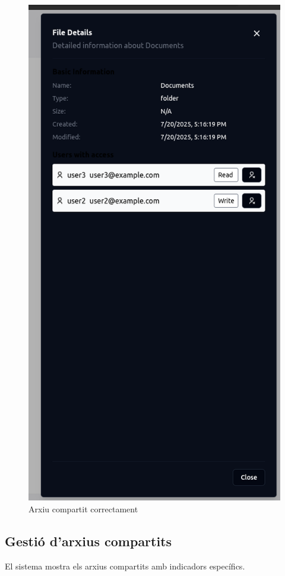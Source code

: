 \begin{figure}[H]
\centering
\includegraphics[width=0.8\linewidth]{Figures/implementacio/shareFileModalSuccess.png}
\caption{Arxiu compartit correctament}
\label{fig:shareFileModalSuccess}
\end{figure}

\subsection{Gestió d'arxius compartits}

El sistema mostra els arxius compartits amb indicadors específics.

